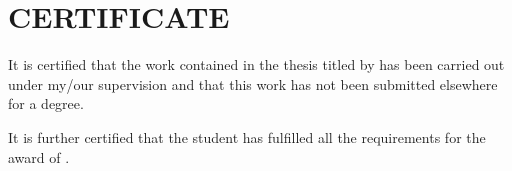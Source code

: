 \chapter*{\centering\normalsize CERTIFICATE}

It is certified that the work contained in the thesis titled \textbf{\thetitle{}} by \textbf{\theauthor{}} has been carried out under my/our supervision and that this work has not been submitted elsewhere for a degree.

It is further certified that the student has fulfilled all the requirements for the award of \textbf{\degree{}}.

\vspace{3cm}

